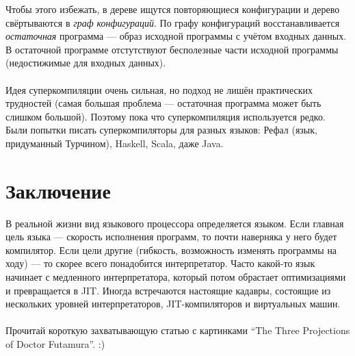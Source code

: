\documentclass[11pt]{book}
\begin{document}
Чтобы этого избежать, в дереве ищутся повторяющиеся конфигурации и дерево свёртываются в \emph{граф конфигураций}.
По графу конфигураций восстанавливается \emph{остаточная} программа --- образ исходной программы с учётом входных данных.
В остаточной программе отстутствуют бесполезные части исходной программы (недостижимые для входных данных).
\\ \\
Идея суперкомпиляции очень сильная, но подход не лишён практических трудностей
(самая большая проблема --- остаточная программа может быть слишком большой).
Поэтому пока что суперкомпиляция используется редко.
Были попытки писать суперкомпиляторы для разных языков: Рефал (язык, придуманный Турчином), Haskell, Scala, даже Java.

\section{Заключение}
В реальной жизни вид языкового процессора определяется языком.
Если главная цель языка --- скорость исполнения программ, то почти наверняка у него будет компилятор.
Если цели другие (гибкость, возможность изменять программы на ходу) --- то скорее всего понадобится интерпретатор.
Часто какой-то язык начинает с медленного интерпретатора, который потом обрастает оптимизациями и превращается в JIT.
Иногда встречаются настоящие кадавры, состоящие из нескольких уровней интерпретаторов, JIT-компиляторов и виртуальных машин.
\\ \\
Прочитай короткую захватывающую статью с картинками ``The Three Projections of Doctor Futamura''. :)
\end{document}
